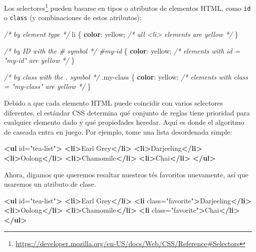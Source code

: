 \documentclass[12pt,]{krantz}
\makeatletter
\newenvironment{Shaded}{\begin{snugshade}}{\end{snugshade}}
\newcommand{\CommentTok}[1]{\textcolor[rgb]{0.56,0.35,0.01}{\textit{#1}}}
\newcommand{\DecValTok}[1]{\textcolor[rgb]{0.00,0.00,0.81}{#1}}
\newcommand{\FunctionTok}[1]{\textcolor[rgb]{0.00,0.00,0.00}{#1}}
\newcommand{\KeywordTok}[1]{\textcolor[rgb]{0.13,0.29,0.53}{\textbf{#1}}}
\newcommand{\NormalTok}[1]{#1}
\newcommand{\OtherTok}[1]{\textcolor[rgb]{0.56,0.35,0.01}{#1}}
\newcommand{\PreprocessorTok}[1]{\textcolor[rgb]{0.56,0.35,0.01}{\textit{#1}}}
\newcommand{\StringTok}[1]{\textcolor[rgb]{0.31,0.60,0.02}{#1}}
\renewcommand{\href}[2]{#2\footnote{\url{#1}}}
\newenvironment{kframe}{%
\medskip{}
\setlength{\fboxsep}{.8em}
 \def\at@end@of@kframe{}%
 \ifinner\ifhmode%
  \def\at@end@of@kframe{\end{minipage}}%
  \begin{minipage}{\columnwidth}%
 \fi\fi%
 \def\FrameCommand##1{\hskip\@totalleftmargin \hskip-\fboxsep
 \colorbox{shadecolor}{##1}\hskip-\fboxsep
     \hskip-\linewidth \hskip-\@totalleftmargin \hskip\columnwidth}%
 \MakeFramed {\advance\hsize-\width
   \@totalleftmargin\z@ \linewidth\hsize
   \@setminipage}}%
 {\par\unskip\endMakeFramed%
 \at@end@of@kframe}
\renewenvironment{Shaded}{\begin{kframe}}{\end{kframe}}
\theoremstyle{definition}
\theoremstyle{definition}
\theoremstyle{definition}
\theoremstyle{remark}
\makeatother
\begin{document}
Los
\href{https://developer.mozilla.org/en-US/docs/Web/CSS/Reference\#Selectors}{selectores}
pueden basarse en tipos o atributos de elementos HTML, como \texttt{id}
o \texttt{class} (y combinaciones de estos atributos):

\begin{Shaded}
\begin{Highlighting}[]
\CommentTok{/* by element type */}
\NormalTok{li \{ }
    \KeywordTok{color}\NormalTok{: }\DecValTok{yellow}\NormalTok{; }\CommentTok{/* all <li> elements are yellow */}
\NormalTok{\}}

\CommentTok{/* by ID with the # symbol */}
\PreprocessorTok{#my-id}\NormalTok{ \{ }
    \KeywordTok{color}\NormalTok{: }\DecValTok{yellow}\NormalTok{; }\CommentTok{/* elements with id = "my-id" are yellow */}
\NormalTok{\}}

\CommentTok{/* by class with the . symbol */}
\FunctionTok{.my-class}\NormalTok{ \{ }
    \KeywordTok{color}\NormalTok{: }\DecValTok{yellow}\NormalTok{; }\CommentTok{/* elements with class = "my-class" are yellow  */}
\NormalTok{\}}
\end{Highlighting}
\end{Shaded}

Debido a que cada elemento HTML puede coincidir con varios selectores
diferentes, el estándar CSS determina qué conjunto de reglas tiene
prioridad para cualquier elemento dado y qué propiedades heredar. Aquí
es donde el algoritmo de cascada entra en juego. Por ejemplo, tome una
lista desordenada simple:

\begin{Shaded}
\begin{Highlighting}[]
\KeywordTok{<ul}\OtherTok{ id=}\StringTok{"tea-list"}\KeywordTok{>}
  \KeywordTok{<li>}\NormalTok{Earl Grey}\KeywordTok{</li>}
  \KeywordTok{<li>}\NormalTok{Darjeeling}\KeywordTok{</li>}
  \KeywordTok{<li>}\NormalTok{Oolong}\KeywordTok{</li>}
  \KeywordTok{<li>}\NormalTok{Chamomile}\KeywordTok{</li>}
  \KeywordTok{<li>}\NormalTok{Chai}\KeywordTok{</li>}
\KeywordTok{</ul>}
\end{Highlighting}
\end{Shaded}

Ahora, digamos que queremos resaltar nuestros tés favoritos nuevamente,
así que usaremos un atributo de clase.

\begin{Shaded}
\begin{Highlighting}[]
\KeywordTok{<ul}\OtherTok{ id=}\StringTok{"tea-list"}\KeywordTok{>}
  \KeywordTok{<li>}\NormalTok{Earl Grey}\KeywordTok{</li>}
  \KeywordTok{<li}\OtherTok{ class=}\StringTok{"favorite"}\KeywordTok{>}\NormalTok{Darjeeling}\KeywordTok{</li>}
  \KeywordTok{<li>}\NormalTok{Oolong}\KeywordTok{</li>}
  \KeywordTok{<li>}\NormalTok{Chamomile}\KeywordTok{</li>}
  \KeywordTok{<li}\OtherTok{ class=}\StringTok{"favorite"}\KeywordTok{>}\NormalTok{Chai}\KeywordTok{</li>}
\KeywordTok{</ul>}
\end{Highlighting}
\end{Shaded}
\end{document}
